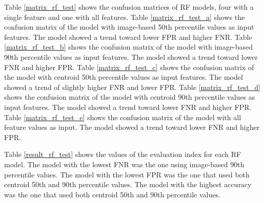 ﻿Table \ref{matrix_rf_test} shows the confusion matrices of RF models, four with a single feature and one with all features. 
% 
Table \ref{matrix_rf_test_a} shows the confusion matrix of the model with image-based 50th percentile values as input features. 
% 
The model showed a trend toward lower FPR and higher FNR.
% 
Table \ref{matrix_rf_test_b} shows the confusion matrix of the model with image-based 90th percentile values as input features. 
% 
The model showed a trend toward lower FNR and higher FPR.
%
Table \ref{matrix_rf_test_c} shows the confusion matrix of the model with centroid 50th percentile values as input features. 
% 
The model showed a trend of slightly higher FNR and lower FPR.
%
Table \ref{matrix_rf_test_d} shows the confusion matrix of the model with centroid 90th percentile values as input features. 
% 
The model showed a trend toward lower FNR and higher FPR.
% 
Table \ref{matrix_rf_test_e} shows the confusion matrix of the model with all feature values as input. 
% 
The model showed a trend toward lower FNR and higher FPR.
 
%
Table \ref{result_rf_test} shows the values of the evaluation index for each RF model.
% 
The model with the lowest FNR was the one using image-based 90th percentile values.
%
The model with the lowest FPR was the one that used both centroid 50th and 90th percentile values.
% 
The model with the highest accuracy was the one that used both centroid 50th and 90th percentile values.
